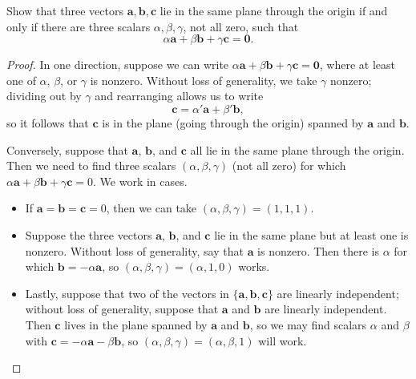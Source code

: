 \documentclass[openany]{book}
\begin{document}
\begin{prob}[12]
    Show that three vectors \( \mathbf{a}, \mathbf{b}, \mathbf{c} \) lie in the same plane through the origin if and only if there are three scalars \( \alpha, \beta, \gamma \), not all zero, such that
    \[
        \alpha \mathbf{a} + \beta \mathbf{b} + \gamma \mathbf{c} = \mathbf{0}.
    \]
\end{prob}
\begin{proof}
    In one direction, suppose we can write $\alpha\mathbf a+\beta\mathbf b+\gamma\mathbf c=\mathbf 0$, where at least one of $\alpha$, $\beta$, or $\gamma$ is nonzero. Without loss of generality, we take $\gamma$ nonzero; dividing out by $\gamma$ and rearranging allows us to write
    \[\mathbf c=\alpha'\mathbf a+\beta'\mathbf b,\]
    so it follows that $\mathbf c$ is in the plane (going through the origin) spanned by $\mathbf a$ and $\mathbf b$.

    Conversely, suppose that $\mathbf a$, $\mathbf b$, and $\mathbf c$ all lie in the same plane through the origin. Then we need to find three scalars $(\alpha,\beta,\gamma)$ (not all zero) for which $\alpha\mathbf a+\beta\mathbf b+\gamma\mathbf c=0$. We work in cases.
    \begin{itemize}
        \item If $\mathbf a=\mathbf b=\mathbf c=0$, then we can take $(\alpha,\beta,\gamma)=(1,1,1)$.
        \item Suppose the three vectors $\mathbf a$, $\mathbf b$, and $\mathbf c$ lie in the same plane but at least one is nonzero. Without loss of generality, say that $\mathbf a$ is nonzero. Then there is $\alpha$ for which $\mathbf b=-\alpha\mathbf a$, so $(\alpha,\beta,\gamma)=(\alpha,1,0)$ works.
        \item Lastly, suppose that two of the vectors in $\{\mathbf a,\mathbf b,\mathbf c\}$ are linearly independent; without loss of generality, suppose that $\mathbf a$ and $\mathbf b$ are linearly independent. Then $\mathbf c$ lives in the plane spanned by $\mathbf a$ and $\mathbf b$, so we may find scalars $\alpha$ and $\beta$ with $\mathbf c=-\alpha\mathbf a-\beta\mathbf b$, so $(\alpha,\beta,\gamma)=(\alpha,\beta,1)$ will work.
        \qedhere
    \end{itemize}
\end{proof}
\end{document}
